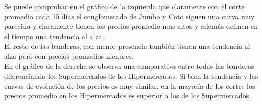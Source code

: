 Se puede comprobar en el gráfico de la izquierda que claramente con el corte promedio cada 15 días el conglomerado de Jumbo y Coto siguen una curva muy parecida y claramente tienen los precios promedio mas altos y además definen en el tiempo una tendencia al alza.\\
El resto de las banderas, con menor presencia también tienen una tendencia al alza pero con precios promedios menores.\\
En el gráfico de la derecha se observa una comparativa entre todas las banderas diferenciando los Supermercados de los Hipermercados. Si bien la tendencia y las curvas de evolución de los precios es muy similar, en la mayoría de los cortes los precios promedio en los Hipermercados es superior a los de los Supermercados.

